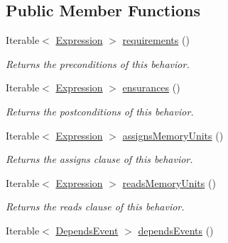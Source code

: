 \subsection*{Public Member Functions}
\begin{DoxyCompactItemize}
\item 
Iterable$<$ \hyperlink{interfaceedu_1_1udel_1_1cis_1_1vsl_1_1civl_1_1model_1_1IF_1_1expression_1_1Expression}{Expression} $>$ \hyperlink{interfaceedu_1_1udel_1_1cis_1_1vsl_1_1civl_1_1model_1_1IF_1_1contract_1_1FunctionBehavior_ab5735521005f84817478e4752c901f6d}{requirements} ()
\begin{DoxyCompactList}\small\item\em Returns the preconditions of this behavior. \end{DoxyCompactList}\item 
Iterable$<$ \hyperlink{interfaceedu_1_1udel_1_1cis_1_1vsl_1_1civl_1_1model_1_1IF_1_1expression_1_1Expression}{Expression} $>$ \hyperlink{interfaceedu_1_1udel_1_1cis_1_1vsl_1_1civl_1_1model_1_1IF_1_1contract_1_1FunctionBehavior_ac63226afa43432b0291cf5f9477e1df0}{ensurances} ()
\begin{DoxyCompactList}\small\item\em Returns the postconditions of this behavior. \end{DoxyCompactList}\item 
Iterable$<$ \hyperlink{interfaceedu_1_1udel_1_1cis_1_1vsl_1_1civl_1_1model_1_1IF_1_1expression_1_1Expression}{Expression} $>$ \hyperlink{interfaceedu_1_1udel_1_1cis_1_1vsl_1_1civl_1_1model_1_1IF_1_1contract_1_1FunctionBehavior_a6f07ebca1d3f7804ef113992d5241877}{assigns\+Memory\+Units} ()
\begin{DoxyCompactList}\small\item\em Returns the assigns clause of this behavior. \end{DoxyCompactList}\item 
Iterable$<$ \hyperlink{interfaceedu_1_1udel_1_1cis_1_1vsl_1_1civl_1_1model_1_1IF_1_1expression_1_1Expression}{Expression} $>$ \hyperlink{interfaceedu_1_1udel_1_1cis_1_1vsl_1_1civl_1_1model_1_1IF_1_1contract_1_1FunctionBehavior_a5b8eea85e92deb02c077a1eb4450536e}{reads\+Memory\+Units} ()
\begin{DoxyCompactList}\small\item\em Returns the reads clause of this behavior. \end{DoxyCompactList}\item 
Iterable$<$ \hyperlink{interfaceedu_1_1udel_1_1cis_1_1vsl_1_1civl_1_1model_1_1IF_1_1contract_1_1DependsEvent}{Depends\+Event} $>$ \hyperlink{interfaceedu_1_1udel_1_1cis_1_1vsl_1_1civl_1_1model_1_1IF_1_1contract_1_1FunctionBehavior_af6aa313ee96582ff4bac86cc75254107}{depends\+Events} ()

\end{DoxyCompactItemize}
